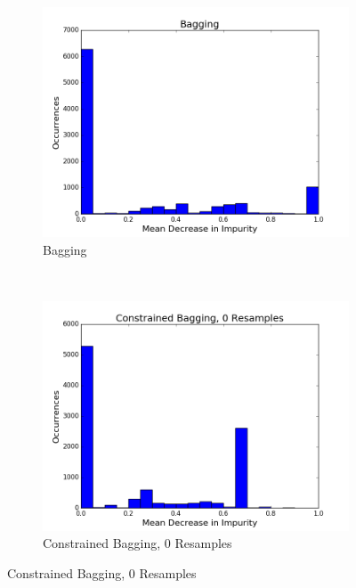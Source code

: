 \begin{figure}[H]
  \centering
  \caption{Mean Decrease in Impurity for Bagging and Constrained Bagging}
  \begin{subfigure}[b]{0.45\textwidth}
    \includegraphics[width=\textwidth]{figures/random_forests/bagging_bias_bagging_hist.png}
    \caption{Bagging}
    \label{fig:bagging-bias-bagging}
  \end{subfigure}
  ~
  \begin{subfigure}[b]{0.45\textwidth}
    \includegraphics[width=\textwidth]{figures/random_forests/bagging_bias_no_bagging_hist.png}
    \caption{Constrained Bagging, 0 Resamples}
    \label{fig:bagging-bias-constrained-0}
  \end{subfigure}

\end{figure}
